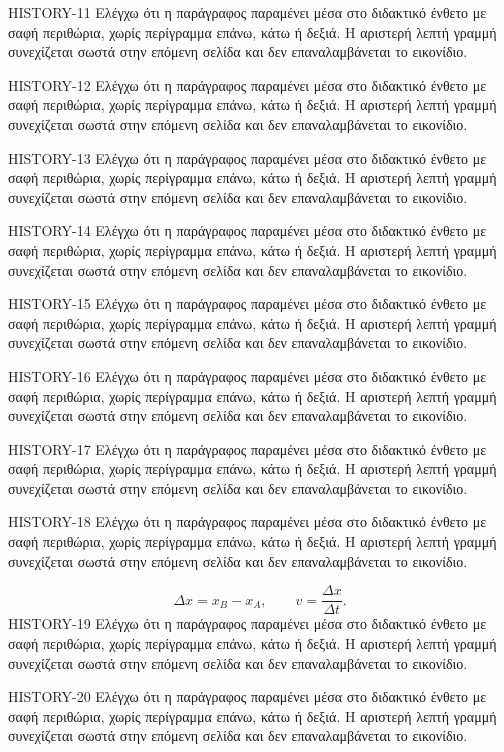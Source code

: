 \begin{HistoryBox}
HISTORY-11 Ελέγχω ότι η παράγραφος παραμένει μέσα στο διδακτικό ένθετο με σαφή περιθώρια, χωρίς περίγραμμα επάνω, κάτω ή δεξιά. Η αριστερή λεπτή γραμμή συνεχίζεται σωστά στην επόμενη σελίδα και δεν επαναλαμβάνεται το εικονίδιο.\par
HISTORY-12 Ελέγχω ότι η παράγραφος παραμένει μέσα στο διδακτικό ένθετο με σαφή περιθώρια, χωρίς περίγραμμα επάνω, κάτω ή δεξιά. Η αριστερή λεπτή γραμμή συνεχίζεται σωστά στην επόμενη σελίδα και δεν επαναλαμβάνεται το εικονίδιο.\par
HISTORY-13 Ελέγχω ότι η παράγραφος παραμένει μέσα στο διδακτικό ένθετο με σαφή περιθώρια, χωρίς περίγραμμα επάνω, κάτω ή δεξιά. Η αριστερή λεπτή γραμμή συνεχίζεται σωστά στην επόμενη σελίδα και δεν επαναλαμβάνεται το εικονίδιο.\par
HISTORY-14 Ελέγχω ότι η παράγραφος παραμένει μέσα στο διδακτικό ένθετο με σαφή περιθώρια, χωρίς περίγραμμα επάνω, κάτω ή δεξιά. Η αριστερή λεπτή γραμμή συνεχίζεται σωστά στην επόμενη σελίδα και δεν επαναλαμβάνεται το εικονίδιο.\par
HISTORY-15 Ελέγχω ότι η παράγραφος παραμένει μέσα στο διδακτικό ένθετο με σαφή περιθώρια, χωρίς περίγραμμα επάνω, κάτω ή δεξιά. Η αριστερή λεπτή γραμμή συνεχίζεται σωστά στην επόμενη σελίδα και δεν επαναλαμβάνεται το εικονίδιο.\par
HISTORY-16 Ελέγχω ότι η παράγραφος παραμένει μέσα στο διδακτικό ένθετο με σαφή περιθώρια, χωρίς περίγραμμα επάνω, κάτω ή δεξιά. Η αριστερή λεπτή γραμμή συνεχίζεται σωστά στην επόμενη σελίδα και δεν επαναλαμβάνεται το εικονίδιο.\par
HISTORY-17 Ελέγχω ότι η παράγραφος παραμένει μέσα στο διδακτικό ένθετο με σαφή περιθώρια, χωρίς περίγραμμα επάνω, κάτω ή δεξιά. Η αριστερή λεπτή γραμμή συνεχίζεται σωστά στην επόμενη σελίδα και δεν επαναλαμβάνεται το εικονίδιο.\par
HISTORY-18 Ελέγχω ότι η παράγραφος παραμένει μέσα στο διδακτικό ένθετο με σαφή περιθώρια, χωρίς περίγραμμα επάνω, κάτω ή δεξιά. Η αριστερή λεπτή γραμμή συνεχίζεται σωστά στην επόμενη σελίδα και δεν επαναλαμβάνεται το εικονίδιο.\par
\[\Delta x=x_B-x_A,\qquad v=\frac{\Delta x}{\Delta t}.\]
HISTORY-19 Ελέγχω ότι η παράγραφος παραμένει μέσα στο διδακτικό ένθετο με σαφή περιθώρια, χωρίς περίγραμμα επάνω, κάτω ή δεξιά. Η αριστερή λεπτή γραμμή συνεχίζεται σωστά στην επόμενη σελίδα και δεν επαναλαμβάνεται το εικονίδιο.\par
HISTORY-20 Ελέγχω ότι η παράγραφος παραμένει μέσα στο διδακτικό ένθετο με σαφή περιθώρια, χωρίς περίγραμμα επάνω, κάτω ή δεξιά. Η αριστερή λεπτή γραμμή συνεχίζεται σωστά στην επόμενη σελίδα και δεν επαναλαμβάνεται το εικονίδιο.\par

\end{HistoryBox}
